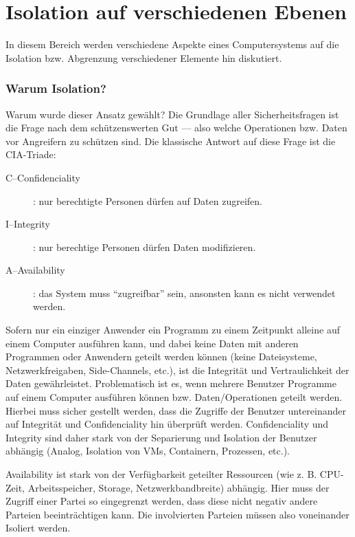 \part{Isolation auf verschiedenen Ebenen}

In diesem Bereich werden verschiedene Aspekte eines Computersystems auf die Isolation bzw. Abgrenzung verschiedener Elemente hin diskutiert.

\section{Warum Isolation?}

Warum wurde dieser Ansatz gewählt? Die Grundlage aller Sicherheitsfragen ist die Frage nach dem schützenswerten Gut --- also welche Operationen bzw. Daten vor Angreifern zu schützen sind. Die klassische Antwort auf diese Frage ist die CIA-Triade:

\begin{description}
	\item[C--Confidenciality]: nur berechtigte Personen dürfen auf Daten zugreifen.
	\item[I--Integrity]: nur berechtige Personen dürfen Daten modifizieren.
	\item[A--Availability]: das System muss ``zugreifbar'' sein, ansonsten kann es nicht verwendet werden.
\end{description}

Sofern nur ein einziger Anwender ein Programm zu einem Zeitpunkt alleine auf einem Computer ausführen kann, und dabei keine Daten mit anderen Programmen oder Anwendern geteilt werden können (keine Dateisysteme, Netzwerkfreigaben, Side-Channels, etc.), ist die Integrität und Vertraulichkeit der Daten gewährleistet. Problematisch ist es, wenn mehrere Benutzer Programme auf einem Computer ausführen können bzw. Daten/Operationen geteilt werden. Hierbei muss sicher gestellt werden, dass die Zugriffe der Benutzer untereinander auf Integrität und Confidenciality hin überprüft werden. Confidenciality und Integrity sind daher stark von der Separierung und Isolation der Benutzer abhängig (Analog, Isolation von VMs, Containern, Prozessen, etc.).

Availability ist stark von der Verfügbarkeit geteilter Ressourcen (wie z. B. CPU-Zeit, Arbeitsspeicher, Storage, Netzwerkbandbreite) abhängig. Hier muss der Zugriff einer Partei so eingegrenzt werden, dass diese nicht negativ andere Parteien beeinträchtigen kann. Die involvierten Parteien müssen also voneinander Isoliert werden.

